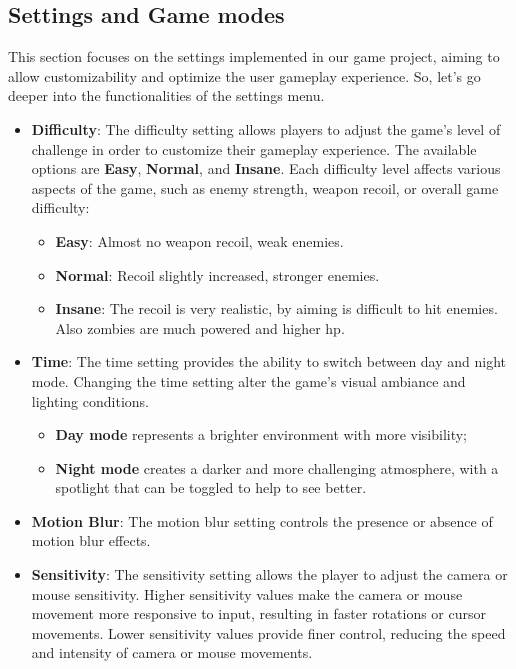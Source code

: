 \documentclass[12pt,a4paper,oneside]{article}
\theoremstyle{definition}
\begin{document}
\subsection{Settings and Game modes}
This section focuses on the settings implemented in our game project, aiming to allow customizability and optimize the user gameplay experience. So, let's go deeper into the functionalities of the settings menu.

\begin{itemize}
    \item \textbf{Difficulty}: The difficulty setting allows players to adjust the game's level of challenge in order to customize their gameplay experience. The available options are \textbf{Easy}, \textbf{Normal}, and \textbf{Insane}. Each difficulty level affects various aspects of the game, such as enemy strength, weapon recoil, or overall game difficulty:
    \begin{itemize}
        \item \textbf{Easy}: Almost no weapon recoil, weak enemies.
        \item \textbf{Normal}: Recoil slightly increased, stronger enemies.
        \item \textbf{Insane}: The recoil is very realistic, by aiming is difficult to hit enemies. Also zombies are much powered and higher hp.
    \end{itemize}
    \item \textbf{Time}: The time setting provides the ability to switch between day and night mode. Changing the time setting alter the game's visual ambiance and lighting conditions. 
    \begin{itemize}
        \item \textbf{Day mode} represents a brighter environment with more visibility;
        \item \textbf{Night mode} creates a darker and more challenging atmosphere, with a spotlight that can be toggled to help to see better.
    \end{itemize}
    \item \textbf{Motion Blur}: The motion blur setting controls the presence or absence of motion blur effects. 
    \item \textbf{Sensitivity}: The sensitivity setting allows the player to adjust the camera or mouse sensitivity. Higher sensitivity values make the camera or mouse movement more responsive to input, resulting in faster rotations or cursor movements. Lower sensitivity values provide finer control, reducing the speed and intensity of camera or mouse movements.

\end{itemize}
\end{document}
